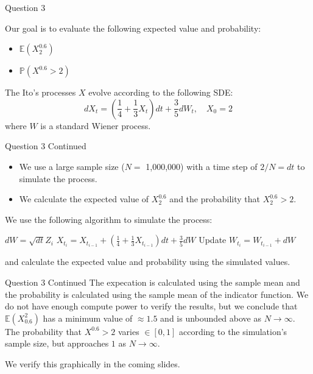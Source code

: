 \documentclass[compress,12pt]{beamer}
\begin{document}
\begin{frame}{Question 3}

    Our goal is to evaluate the following expected value and probability:
    \begin{itemize}
        \item $\mathbb{E}(X^{0.6}_{2})$
        \item $\mathbb{P}(X^{0.6}> 2)$
    \end{itemize}

    The Ito's processes $X$ evolve according to the following SDE:
    \begin{equation*}
        dX_t = \left( \frac{1}{4} + \frac{1}{3}X_t \right) dt + \frac{3}{5} dW_t, \quad X_0 = 2
    \end{equation*}
    where $W$ is a standard Wiener process.

\end{frame}


\begin{frame}{Question 3 Continued}
    \begin{itemize}
        \item We use a large sample size ($N = $ 1,000,000) with a time step of $2 / N = dt$ to simulate the process.
        \item We calculate the expected value of $X_{2}^{0.6}$ and the probability that $X_{2}^{0.6} > 2$.
    \end{itemize}
    We use the following algorithm to simulate the process:
    
    \begin{algorithmic}
            \State $dW = \sqrt{dt} Z_i$
            \State $X_{t_i} = X_{t_{i-1}} + \left( \frac{1}{4} + \frac{1}{3}X_{t_{i-1}} \right) dt + \frac{3}{5} dW$
            \State Update $W_{t_i} = W_{t_{i-1}} + dW$
        \EndFor
    \end{algorithmic}

    and calculate the expected value and probability using the simulated values.

\end{frame}

\begin{frame}{Question 3 Continued}
    The expecation is calculated using the sample mean and the probability is calculated using the sample mean of the indicator function.
    We do not have enough compute power to verify the results, but we conclude that $\mathbb{E}(X^2_{0.6})$ has a {\color{red} minimum} value of $\approx 1.5$
    and is {\color{red} unbounded} above as $N \to \infty$. The probability that $X^{0.6} > 2$ varies $\in[0,1]$ according to the simulation's sample size, but 
    approaches $1$ as $N \to \infty$.
    
    We verify this graphically in the coming slides.
\end{frame}
\end{document}
